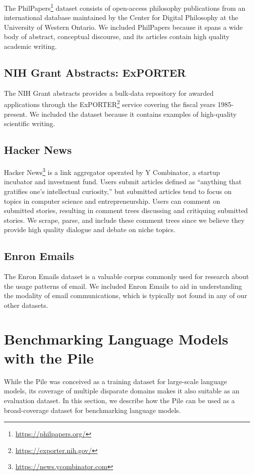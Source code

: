 \documentclass[11pt,a4paper]{article}
\begin{document}
The PhilPapers\footnote{\url{https://philpapers.org/}} dataset consists of open-access philosophy publications from an international database maintained by the Center for Digital Philosophy at the University of Western Ontario. We included PhilPapers because it spans a wide body of abstract, conceptual discourse, and its articles contain high quality academic writing.

\subsection{NIH Grant Abstracts: ExPORTER}

The NIH Grant abstracts provides a bulk-data repository for awarded applications through the {ExPORTER}\footnote{\url{https://exporter.nih.gov/}} service covering the fiscal years 1985-present. We included the dataset because it contains examples of high-quality scientific writing.

\subsection{Hacker News}
Hacker News\footnote{\url{https://news.ycombinator.com}} is a link aggregator operated by Y Combinator, a startup incubator and investment fund. Users submit articles defined as ``anything that gratifies one's intellectual curiosity,'' but submitted articles tend to focus on topics in computer science and entrepreneurship. Users can comment on submitted stories, resulting in comment trees discussing and critiquing submitted stories. We scrape, parse, and include these comment trees since we believe they provide high quality dialogue and debate on niche topics. 

\subsection{Enron Emails}

The Enron Emails dataset \citep{Enron} is a valuable corpus commonly used for research about the usage patterns of email. We included Enron Emails to aid in understanding the modality of email communications, which is typically not found in any of our other datasets.

\section{Benchmarking Language Models with the Pile}

While the Pile was conceived as a training dataset for large-scale language models, its coverage of multiple disparate domains makes it also suitable as an evaluation dataset.
In this section, we describe how the Pile can be used as a broad-coverage dataset for benchmarking language models.
\end{document}
